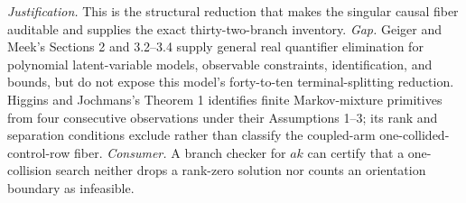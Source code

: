 \documentclass{article}
\begin{document}
\par\smallskip\noindent \textit{Justification.} This is the structural reduction that makes the singular causal fiber auditable and supplies the exact thirty-two-branch inventory. \textit{Gap.} Geiger and Meek's Sections 2 and 3.2--3.4 supply general real quantifier elimination for polynomial latent-variable models, observable constraints, identification, and bounds, but do not expose this model's forty-to-ten terminal-splitting reduction. Higgins and Jochmans's Theorem 1 identifies finite Markov-mixture primitives from four consecutive observations under their Assumptions 1--3; its rank and separation conditions exclude rather than classify the coupled-arm one-collided-control-row fiber. \textit{Consumer.} A branch checker for \(ak\) can certify that a one-collision search neither drops a rank-zero solution nor counts an orientation boundary as infeasible.
\end{document}
